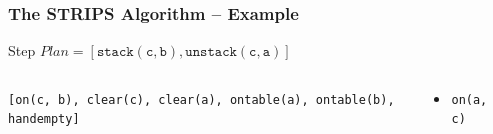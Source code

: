 \documentclass[presentation]{beamer}\mode<presentation>{\usetheme{AMSBolognaFC}}
\begin{document}


\begin{frame}%
\frametitle{The STRIPS Algorithm -- Example}
\small

\begin{exampleblock}{Step \nextStripsExampleStep{} \hfill $Plan = [\mathtt{stack(c,b),unstack(c,a)}]$}
    \begin{columns}[t]
        \begin{column}{.30\linewidth}\centering
            \alert{\texttt{[on(c, b), clear(c), clear(a), ontable(a), ontable(b), handempty]}}
        \end{column}
        \begin{column}{.50\linewidth}\centering
            \begin{itemize}
                \item \texttt{on(a,c)}
            \end{itemize}
        \end{column}
        \begin{column}{.10\linewidth}\centering
            
        \end{column}
    \end{columns}
\end{exampleblock}

\end{frame}
\end{document}
